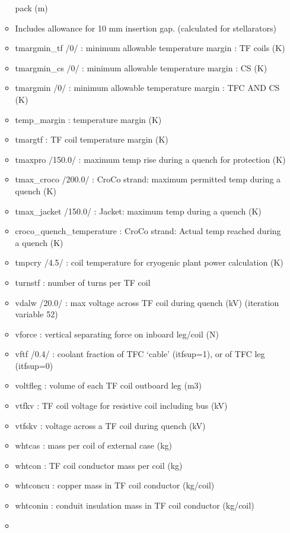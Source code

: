 \documentclass[]{article}
\begin{document}
\begin{itemize}
\begin{itemize}
    pack (m)
  \item
    Includes allowance for 10 mm insertion gap. (calculated for
    stellarators)
  \item
    tmargmin\_tf /0/ : minimum allowable temperature margin : TF coils
    (K)
  \item
    tmargmin\_cs /0/ : minimum allowable temperature margin : CS (K)
  \item
    tmargmin /0/ : minimum allowable temperature margin : TFC AND CS (K)
  \item
    temp\_margin : temperature margin (K)
  \item
    tmargtf : TF coil temperature margin (K)
  \item
    tmaxpro /150.0/ : maximum temp rise during a quench for protection
    (K)
  \item
    tmax\_croco /200.0/ : CroCo strand: maximum permitted temp during a
    quench (K)
  \item
    tmax\_jacket /150.0/ : Jacket: maximum temp during a quench (K)
  \item
    croco\_quench\_temperature : CroCo strand: Actual temp reached
    during a quench (K)
  \item
    tmpcry /4.5/ : coil temperature for cryogenic plant power
    calculation (K)
  \item
    turnstf : number of turns per TF coil
  \item
    vdalw /20.0/ : max voltage across TF coil during quench (kV)
    (iteration variable 52)
  \item
    vforce : vertical separating force on inboard leg/coil (N)
  \item
    vftf /0.4/ : coolant fraction of TFC `cable' (itfsup=1), or of TFC
    leg (itfsup=0)
  \item
    voltfleg : volume of each TF coil outboard leg (m3)
  \item
    vtfkv : TF coil voltage for resistive coil including bus (kV)
  \item
    vtfskv : voltage across a TF coil during quench (kV)
  \item
    whtcas : mass per coil of external case (kg)
  \item
    whtcon : TF coil conductor mass per coil (kg)
  \item
    whtconcu : copper mass in TF coil conductor (kg/coil)
  \item
    whtconin : conduit insulation mass in TF coil conductor (kg/coil)
  \item

\end{itemize}
\end{itemize}
\end{document}
